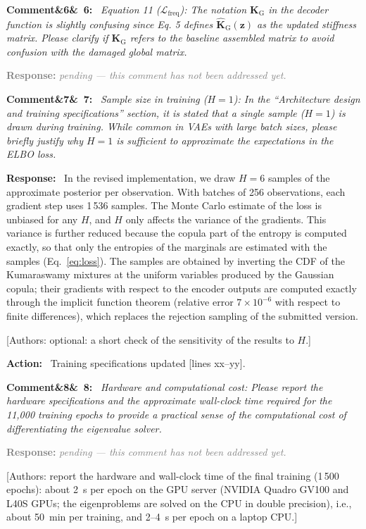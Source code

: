 \documentclass[11pt]{article}
\newenvironment{rcomment}[1]{\par\bigskip\noindent\textbf{Comment\ifx&#1&\else\ #1\fi:}\ \itshape}{\par}
\newenvironment{response}{\par\smallskip\noindent\color{resp}\textbf{Response:}\ }{\par}
\newenvironment{action}{\par\smallskip\noindent\color{resp}\textbf{Action:}\ }{\par}
\newcommand{\pending}{\par\smallskip\noindent\textcolor{gray}{\textbf{Response:} \textit{pending --- this comment
has not been addressed yet.}}\par}
\newcommand{\authornote}[1]{\textcolor{note}{\textsf{[Authors: #1]}}}
\newcommand{\tbd}[1]{\textcolor{note}{\textsf{[#1]}}}
\newcommand{\lines}[1]{\tbd{lines #1}}
\newcommand{\z}{\mathbf{z}}
\begin{document}
\begin{rcomment}{6}
Equation 11 ($\mathcal{L}_{\mathrm{freq}}$): The notation $\mathbf{K}_{\mathrm{G}}$ in the decoder function is slightly
confusing since Eq. 5 defines $\hat{\mathbf{K}}_{\mathrm{G}}(\z)$ as the updated stiffness matrix. Please clarify if
$\mathbf{K}_{\mathrm{G}}$ refers to the baseline assembled matrix to avoid confusion with the damaged global matrix.
\end{rcomment}
\pending

\begin{rcomment}{7}
Sample size in training ($H=1$): In the ``Architecture design and training specifications'' section, it is stated that
a single sample ($H=1$) is drawn during training. While common in VAEs with large batch sizes, please briefly justify why
$H=1$ is sufficient to approximate the expectations in the ELBO loss.
\end{rcomment}

\begin{response}
In the revised implementation, we draw $H=6$ samples of the approximate posterior per observation. With batches of 256
observations, each gradient step uses 1\,536 samples. The Monte Carlo estimate of the loss is unbiased for any $H$, and
$H$ only affects the variance of the gradients. This variance is further reduced because the copula part of the entropy
is computed exactly, so that only the entropies of the marginals are estimated with the samples (Eq.~\eqref{eq:loss}).
The samples are obtained by inverting the CDF of the Kumaraswamy mixtures at the uniform variables produced by the
Gaussian copula; their gradients with respect to the encoder outputs are computed exactly through the implicit function
theorem (relative error $7\times10^{-6}$ with respect to finite differences), which replaces the rejection sampling of
the submitted version.
\end{response}
\authornote{optional: a short check of the sensitivity of the results to $H$.}

\begin{action}
Training specifications updated \lines{xx--yy}.
\end{action}

\begin{rcomment}{8}
Hardware and computational cost: Please report the hardware specifications and the approximate wall-clock time
required for the 11,000 training epochs to provide a practical sense of the computational cost of differentiating the
eigenvalue solver.
\end{rcomment}
\pending
\authornote{report the hardware and wall-clock time of the final training (1\,500 epochs): about 2~s per epoch on the
GPU server (NVIDIA Quadro GV100 and L40S GPUs; the eigenproblems are solved on the CPU in double precision), i.e., about
50~min per training, and 2--4~s per epoch on a laptop CPU.}
\end{document}
